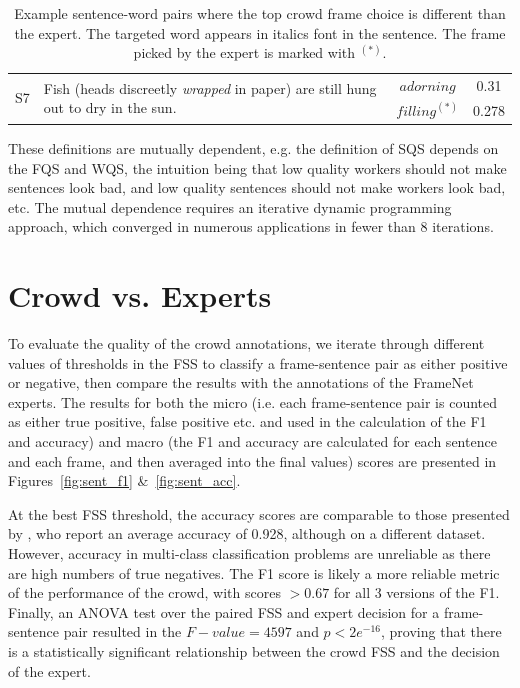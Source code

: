 \begin{table}[tb!]
{\begin{tabular}{cp{8cm}cc}
\multirow{2}{*}{S7} & \multirow{2}{8cm}{Fish (heads discreetly \textit{wrapped} in paper) are still hung out to dry in the sun.} & $adorning$ & 0.31 \\  %
& & $filling^{(*)}$ & 0.278 \\ %
\bottomrule
\end{tabular}
}

\caption{Example sentence-word pairs where the top crowd frame choice is different than the expert. The targeted word appears in italics font in the sentence. The frame picked by the expert is marked with $^{(*)}$.}
\label{tab:disagr}
\end{table}

These definitions are mutually dependent, e.g. the definition of SQS depends on the FQS and WQS, the intuition being that low quality workers should not make sentences look bad, and low quality sentences should not make workers look bad, etc.  The mutual dependence requires an iterative  dynamic programming approach, which converged in numerous applications in fewer than 8 iterations.

\section{Crowd vs. Experts}

To evaluate the quality of the crowd annotations, we iterate through different values of thresholds in the FSS to classify a frame-sentence pair as either positive or negative, then compare the results with the annotations of the FrameNet experts. The results for both the micro (i.e. each frame-sentence pair is counted as either true positive, false positive etc. and used in the calculation of the F1 and accuracy) and macro (the F1 and accuracy are calculated for each sentence and each frame, and then averaged into the final values) scores are presented in Figures~\ref{fig:sent_f1} \&~\ref{fig:sent_acc}.

At the best FSS threshold, the accuracy scores are comparable to those presented by \citet{Hong:2011:GCR:2018966.2018970}, who report an average accuracy of 0.928, although on a different dataset. However, accuracy in multi-class classification problems are unreliable as there are high numbers of true negatives. The F1 score is likely a more reliable metric of the performance of the crowd, with scores $ > 0.67 $ for all 3 versions of the F1. Finally, an ANOVA test over the paired FSS and expert decision for a frame-sentence pair resulted in the $ F-value = 4597 $ and $p < 2e^{-16} $, proving that there is a statistically significant relationship between the crowd FSS and the decision of the expert.

